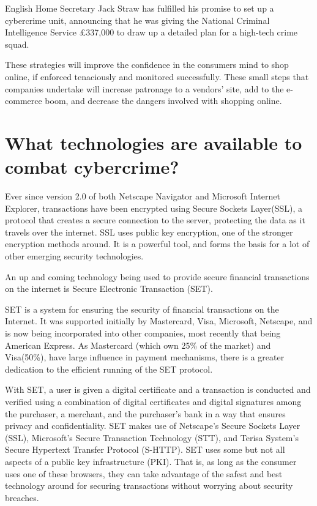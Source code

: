 \documentclass[11pt,a4paper,twoside,notitlepage]{article}
\begin{document}
English Home Secretary Jack Straw has fulfilled his promise to set up a
cybercrime unit, announcing that he was giving the National Criminal
Intelligence Service \pounds 337,000 to draw up a detailed plan for a
high-tech crime squad\cite{August:Comp00}.

These strategies will improve the confidence in the consumers mind to shop online, if enforced tenaciously and monitored successfully.  These small steps that companies undertake will increase patronage to a vendors' site, add to the e-commerce boom, and decrease the dangers involved with shopping online. 




\section*{What technologies are available to combat cybercrime?}


Ever since version 2.0 of both Netscape Navigator and Microsoft Internet Explorer, transactions have been 
encrypted using Secure Sockets Layer(SSL), a protocol that creates a secure connection to the server, protecting
the data as it travels over the internet.  SSL uses public key encryption, one of the stronger encryption methods
around.  It is a powerful tool, and forms the basis for a lot of other emerging security technologies. 


An up and coming technology being used to provide secure financial transactions on
the internet is Secure Electronic Transaction (SET). 

SET is a system for ensuring the security of financial transactions on the Internet. It was 
supported initially by Mastercard, Visa, Microsoft, Netscape, and is now being incorporated into
other companies, most recently that being American Express.
As Mastercard (which own 25\% of the market) and Visa(50\%), have large influence in payment mechanisms,
there is a greater dedication to the efficient running of the SET protocol\cite{Clarke:url99}.


With SET, a user is given a digital certificate and a transaction is
conducted and verified using a combination of digital certificates and digital signatures among the purchaser, a merchant, and the purchaser's
bank in a way that ensures privacy and confidentiality. SET makes use of Netscape's Secure Sockets Layer (SSL), Microsoft's Secure
Transaction Technology (STT), and Terisa System's Secure Hypertext Transfer Protocol (S-HTTP). SET uses some but not all aspects of a
public key infrastructure (PKI).  That is, as long as the
consumer uses one of these browsers, they can take advantage of the safest and
best technology around for securing transactions without worrying about security
breaches.
 
\end{document}
